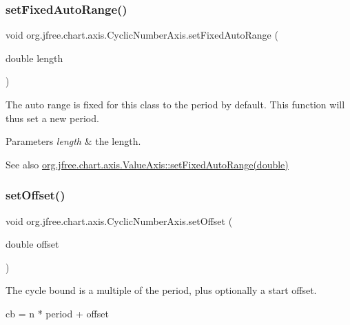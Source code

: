 \subsubsection{\texorpdfstring{set\+Fixed\+Auto\+Range()}{setFixedAutoRange()}}
{\footnotesize\ttfamily void org.\+jfree.\+chart.\+axis.\+Cyclic\+Number\+Axis.\+set\+Fixed\+Auto\+Range (\begin{DoxyParamCaption}\item[{double}]{length }\end{DoxyParamCaption})}

The auto range is fixed for this class to the period by default. This function will thus set a new period.


\begin{DoxyParams}{Parameters}
{\em length} & the length.\\
\hline
\end{DoxyParams}
\begin{DoxySeeAlso}{See also}
\mbox{\hyperlink{classorg_1_1jfree_1_1chart_1_1axis_1_1_value_axis_a35c73feedf55ee5dba21cd4aba5014d8}{org.\+jfree.\+chart.\+axis.\+Value\+Axis\+::set\+Fixed\+Auto\+Range(double)}} 
\end{DoxySeeAlso}
\mbox{\label{classorg_1_1jfree_1_1chart_1_1axis_1_1_cyclic_number_axis_acd1116d5cc3c056b40c87acbbd40b7a1}} 
\subsubsection{\texorpdfstring{set\+Offset()}{setOffset()}}
{\footnotesize\ttfamily void org.\+jfree.\+chart.\+axis.\+Cyclic\+Number\+Axis.\+set\+Offset (\begin{DoxyParamCaption}\item[{double}]{offset }\end{DoxyParamCaption})}

The cycle bound is a multiple of the period, plus optionally a start offset. 
\begin{DoxyPre}cb = n * period + offset\end{DoxyPre}



